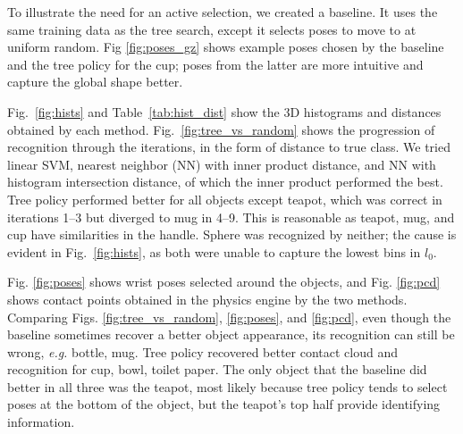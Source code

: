 \documentclass[letterpaper, 10 pt, conference]{ieeeconf}  %
\newcommand{\TODO}[1]{{\color{red}TODO: #1}}
\begin{document}
\label{sec:baseline}



To illustrate the need for an active selection, we created a baseline. It uses the same training data as the tree search, except it selects poses to move to at uniform random.
Fig \ref{fig:poses_gz} shows example poses chosen by the baseline and the tree policy for the cup; poses from the latter are more intuitive and capture the global shape better.


Fig.~\ref{fig:hists} and Table~\ref{tab:hist_dist} show the 3D histograms and distances obtained by each method.
Fig.~\ref{fig:tree_vs_random} shows the progression of recognition through the iterations, in the form of distance to true class.
We tried linear SVM, nearest neighbor (NN) with inner product distance, and NN with histogram intersection distance, of which the inner product performed the best.
Tree policy performed better for all objects except teapot, which was correct in iterations 1--3 but diverged to mug in 4--9. This is reasonable as teapot, mug, and cup have similarities in the handle. Sphere was recognized by neither; the cause is evident in Fig.~\ref{fig:hists}, as both were unable to capture the lowest bins in $l_0$.

Fig. \ref{fig:poses} shows wrist poses selected around the objects, and Fig. \ref{fig:pcd} shows contact points obtained in the physics engine by the two methods. 
Comparing Figs. \ref{fig:tree_vs_random}, \ref{fig:poses}, and \ref{fig:pcd}, even though the baseline sometimes recover a better object appearance, its recognition can still be wrong, \textit{e.g.} bottle, mug.
Tree policy recovered better contact cloud and recognition for cup, bowl, toilet paper.
The only object that the baseline did better in all three was the teapot, most likely because tree policy tends to select poses at the bottom of the object, but the teapot's top half provide identifying information.
\end{document}
